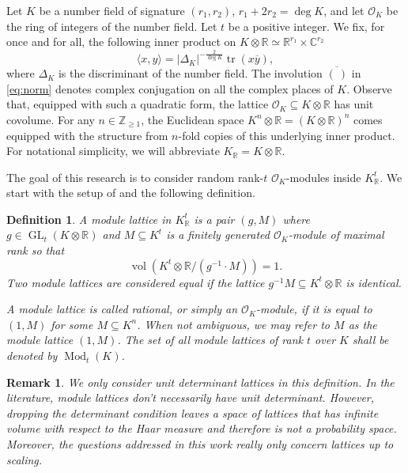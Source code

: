 \documentclass{amsart}
\newtheorem{definition}[theorem]{Definition}
\newtheorem{remark}[theorem]{Remark}
\newcommand{\OK}{\mathcal{O}_K}
\newcommand{\KR}{K_\mathbb{R}}
\DeclareMathOperator{\ML}{Mod}
\DeclareMathOperator{\GL}{GL}
\DeclareMathOperator{\vol}{vol}
\DeclareMathOperator{\N}{N}
\DeclareMathOperator{\Tr}{tr}
\begin{document}
Let $K$ be a number field of signature $(r_1,r_2)$, $r_1 + 2 r_2 = \deg K$,
and let $\OK$ be the ring of integers of the number field. Let $t$ be a positive integer.
We fix, for once and for all, the following  inner product on $K \otimes \mathbb{R} \simeq \mathbb{R}^{r_1} \times \mathbb{C}^{r_2}$
\begin{equation}
  \langle x,y\rangle = |\Delta_K|^{-\frac{2}{\deg K}}  \Tr(x\overline{y}),
  \label{eq:norm}
\end{equation}
where $\Delta_K$ is the discriminant of the number field. The involution $\overline{(\ ) }$ in \eqref{eq:norm}
denotes complex conjugation
on all the complex places of $K$.
Observe that, equipped with such a quadratic form, the lattice $\OK \subseteq K \otimes \mathbb{R}$ has unit covolume. For any $n \in \mathbb{Z}_{\geq 1}$, the Euclidean space $K^{n} \otimes \mathbb{R} = (K\otimes \mathbb{R})^{n}$ comes equipped with the structure from $n$-fold copies of this underlying inner product.
For notational simplicity, we will abbreviate $\KR = K \otimes \mathbb{R}$. 

The goal of this research is to consider random rank-$t$ $\OK$-modules inside $\KR^t$. 
We start with the setup of \cite{DK22} and the following definition.
\begin{definition}
A module lattice in $\KR^{t}$ is a pair 
$(g,M)$ where $g \in \GL_{t}(K \otimes \mathbb{R})$ and $M \subseteq K^{t}$ is a finitely generated $\OK$-module of maximal rank so that 
\begin{equation}
	\vol\left(K^{t} \otimes \mathbb{R} / (g^{-1} \cdot M ) \right) = 1.
\end{equation}
Two module lattices are considered equal if the lattice $g^{-1}M \subseteq K^{t} \otimes \mathbb{R}$ is identical.

A module lattice is called rational, or simply an $\OK$-module, if it is equal to $(1,M)$ for some $M \subseteq K^{n}$.
When not ambiguous, we may refer to $M$ as the module lattice $(1, M)$. The set of all module lattices of rank $t$ over $K$ shall be denoted by $\ML_{t}(K)$.
\end{definition}

\begin{remark}
We only consider unit determinant lattices in this definition. In the literature, module lattices don't necessarily have unit determinant. However, dropping the determinant condition leaves a space of lattices that has infinite volume with respect to the Haar measure and therefore is not a probability space. Moreover, the questions addressed in this work really only concern lattices up to scaling. 
\end{remark}
\end{document}
